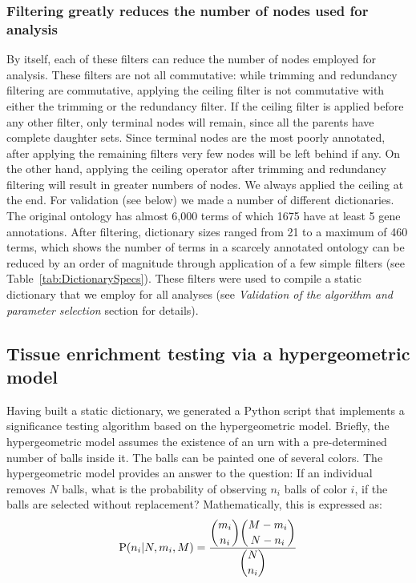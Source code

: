 \documentclass{bmcart}
\begin{document}
\subsubsection*{Filtering greatly reduces the number of nodes used for analysis}
By itself, each of these filters can reduce the number of nodes employed for analysis. These filters are not all commutative: while trimming and redundancy filtering are commutative, applying the ceiling filter is not commutative with either the trimming or the redundancy filter. If the ceiling filter is applied before any other filter, only terminal nodes will remain, since all the parents have complete daughter sets. Since terminal nodes are the most poorly annotated, after applying the remaining filters very few nodes will be left behind if any. On the other hand, applying the ceiling operator after trimming and redundancy filtering will result in greater numbers of nodes. We always applied the ceiling at the end. For validation (see below) we made a number of different dictionaries. The original ontology has almost 6,000 terms of which 1675 have at least 5 gene annotations. After filtering, dictionary sizes ranged from 21 to a maximum of 460 terms, which shows the number of terms in a scarcely annotated ontology can be reduced by an order of magnitude through application of a few simple filters (see Table~\ref{tab:DictionarySpecs}). These filters were used to compile a static dictionary that we employ for all analyses (see \emph{Validation of the algorithm and parameter selection} section for details). 

\subsection*{Tissue enrichment testing via a hypergeometric model}
Having built a static dictionary, we generated a Python script that implements a significance testing algorithm based on the hypergeometric model. Briefly, the hypergeometric model assumes the existence of an urn with a pre-determined number of balls inside it. The balls can be painted one of several colors. The hypergeometric model provides an answer to the question: If an individual removes $N$ balls, what is the probability of observing $n_i$ balls of color $i$, if the balls are selected without replacement? Mathematically, this is expressed as: 
\begin{eqnarray}\label{hypergeometric}
	\mathrm{P}(n_i | N, m_i, M) = \frac{\dbinom{m_i}{n_i} \dbinom{M-m_i}{N - n_i}}{\dbinom{N}{n_i}}
\end{eqnarray}
\end{document}
